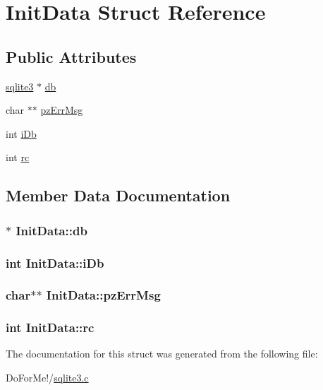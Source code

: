 \hypertarget{struct_init_data}{\section{Init\-Data Struct Reference}
\label{struct_init_data}
}
\subsection*{Public Attributes}
\begin{DoxyCompactItemize}
\item 
\hyperlink{structsqlite3}{sqlite3} $\ast$ \hyperlink{struct_init_data_adc9e29c56e0392076e92d7f4b29fa272}{db}
\item 
char $\ast$$\ast$ \hyperlink{struct_init_data_aa8aef34241ec214f038b38932ffe1357}{pz\-Err\-Msg}
\item 
int \hyperlink{struct_init_data_ad6c7953b49d351cd9fb14e3394010689}{i\-Db}
\item 
int \hyperlink{struct_init_data_a627153a3de2c4d159ae44ebc03961592}{rc}
\end{DoxyCompactItemize}


\subsection{Member Data Documentation}
\hypertarget{struct_init_data_adc9e29c56e0392076e92d7f4b29fa272}{
\subsubsection[{db}]{$\ast$ Init\-Data\-::db}}\label{struct_init_data_adc9e29c56e0392076e92d7f4b29fa272}
\hypertarget{struct_init_data_ad6c7953b49d351cd9fb14e3394010689}{
\subsubsection[{i\-Db}]{\setlength{\rightskip}{0pt plus 5cm}int Init\-Data\-::i\-Db}}\label{struct_init_data_ad6c7953b49d351cd9fb14e3394010689}
\hypertarget{struct_init_data_aa8aef34241ec214f038b38932ffe1357}{
\subsubsection[{pz\-Err\-Msg}]{\setlength{\rightskip}{0pt plus 5cm}char$\ast$$\ast$ Init\-Data\-::pz\-Err\-Msg}}\label{struct_init_data_aa8aef34241ec214f038b38932ffe1357}
\hypertarget{struct_init_data_a627153a3de2c4d159ae44ebc03961592}{
\subsubsection[{rc}]{\setlength{\rightskip}{0pt plus 5cm}int Init\-Data\-::rc}}\label{struct_init_data_a627153a3de2c4d159ae44ebc03961592}


The documentation for this struct was generated from the following file\-:\begin{DoxyCompactItemize}
\item 
Do\-For\-Me!/\hyperlink{sqlite3_8c}{sqlite3.\-c}\end{DoxyCompactItemize}
